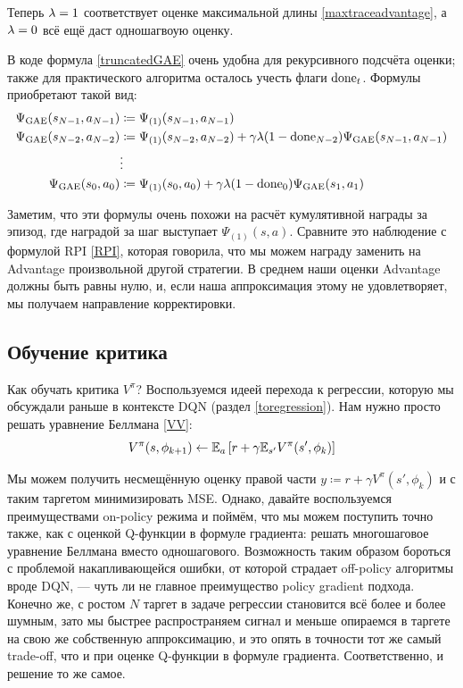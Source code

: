Теперь $\lambda \HM= 1$ соответствует оценке максимальной длины \eqref{maxtraceadvantage}, а $\lambda \HM= 0$ всё ещё даст одношагвоую оценку.

В коде формула \eqref{truncatedGAE} очень удобна для рекурсивного подсчёта оценки; также для практического алгоритма осталось учесть флаги $\mathrm{done}_t$. Формулы приобретают такой вид:
\begin{equation*}
\begin{split}
\Psi_{\mathrm{GAE}}(s_{N-1}, a_{N-1}) &\coloneqq \Psi_{(1)}(s_{N-1}, a_{N-1}) \\
\Psi_{\mathrm{GAE}}(s_{N-2}, a_{N-2}) &\coloneqq \Psi_{(1)}(s_{N-2}, a_{N-2}) + \gamma \lambda (1 - \mathrm{done}_{N-2}) \Psi_{\mathrm{GAE}}(s_{N-1}, a_{N-1}) \\
&\vdots \\
\Psi_{\mathrm{GAE}}(s_0, a_0) &\coloneqq \Psi_{(1)}(s_0, a_0) + \gamma \lambda (1 - \mathrm{done}_0) \Psi_{\mathrm{GAE}}(s_1, a_1)
\end{split}
\end{equation*}

Заметим, что эти формулы очень похожи на расчёт кумулятивной награды за эпизод, где наградой за шаг выступает $\Psi_{(1)}(s, a)$. Сравните это наблюдение с формулой RPI \eqref{RPI}, которая говорила, что мы можем награду заменить на Advantage произвольной другой стратегии. В среднем наши оценки Advantage должны быть равны нулю, и, если наша аппроксимация этому не удовлетворяет, мы получаем направление корректировки.

\subsection{Обучение критика}

Как обучать критика $V^\pi$? Воспользуемся идеей перехода к регрессии, которую мы обсуждали раньше в контексте DQN (раздел \ref{toregression}). Нам нужно просто решать уравнение Беллмана \eqref{VV}:
$$V^\pi(s, \phi_{k+1}) \leftarrow \mathbb{E}_{a} \left[ r + \gamma \mathbb{E}_{s'} V^\pi(s', \phi_k) \right]$$

Мы можем получить несмещённую оценку правой части $y \coloneqq r + \gamma V^\pi(s', \phi_k)$ и с таким таргетом минимизировать MSE. Однако, давайте воспользуемся преимуществами on-policy режима и поймём, что мы можем поступить точно также, как с оценкой Q-функции в формуле градиента: решать многошаговое уравнение Беллмана вместо одношагового. Возможность таким образом бороться с проблемой накапливающейся ошибки, от которой страдает off-policy алгоритмы вроде DQN, --- чуть ли не главное преимущество policy gradient подхода. Конечно же, с ростом $N$ таргет в задаче регрессии становится всё более и более шумным, зато мы быстрее распространяем сигнал и меньше опираемся в таргете на свою же собственную аппроксимацию, и это опять в точности тот же самый trade-off, что и при оценке Q-функции в формуле градиента. Соответственно, и решение то же самое.

